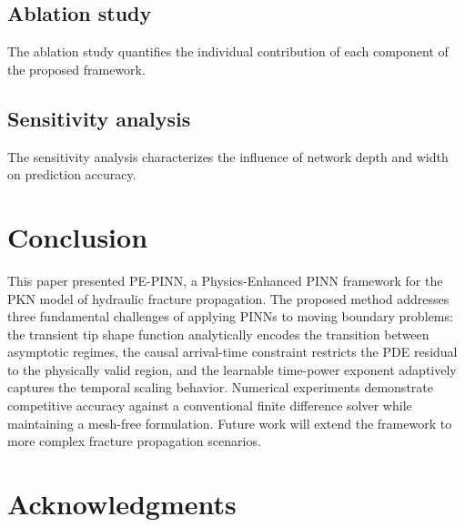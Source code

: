 \documentclass{ws-ijcm}
\begin{document}
\subsection{Ablation study}


The ablation study quantifies the individual contribution of each
component of the proposed framework.

\subsection{Sensitivity analysis}


The sensitivity analysis characterizes the influence of network depth
and width on prediction accuracy.

\section{Conclusion}

This paper presented PE-PINN, a Physics-Enhanced PINN framework for the PKN
model of hydraulic fracture propagation. The proposed method addresses
three fundamental challenges of applying PINNs to moving boundary
problems: the transient tip shape function analytically encodes the
transition between asymptotic regimes, the causal arrival-time
constraint restricts the PDE residual to the physically valid region,
and the learnable time-power exponent adaptively captures the temporal
scaling behavior. Numerical experiments demonstrate competitive
accuracy against a conventional finite difference solver while
maintaining a mesh-free formulation. Future work will extend the
framework to more complex fracture propagation scenarios.

\section*{Acknowledgments}
\end{document}
